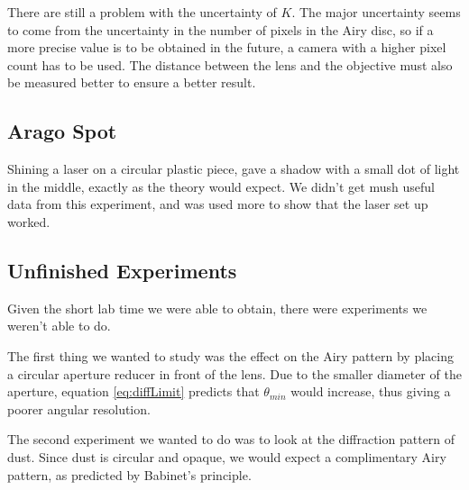 \documentclass{emulateapj}
\begin{document}
There are still a problem with the uncertainty of $K$. The major uncertainty seems to come from the uncertainty in the number of pixels in the Airy disc, so if a more precise value is to be obtained in the future, a camera with a higher pixel count has to be used. The distance between the lens and the objective must also be measured better to ensure a better result.


\subsection{Arago Spot}
Shining a laser on a circular plastic piece, gave a shadow with a small dot of light in the middle, exactly as the theory would expect. We didn't get mush useful data from this experiment, and was used more to show that the laser set up worked.

\subsection{Unfinished Experiments}
Given the short lab time we were able to obtain, there were experiments we weren't able to do.

The first thing we wanted to study was the effect on the Airy pattern by placing a circular aperture reducer in front of the lens. Due to the smaller diameter of the aperture, equation \eqref{eq:diffLimit} predicts that $\theta_{min}$ would increase, thus giving a poorer angular resolution.

The second experiment we wanted to do was to look at the diffraction pattern of dust. Since dust is circular and opaque, we would expect a complimentary Airy pattern, as predicted by Babinet's principle.

\begin{thebibliography}{}
%
%
\end{thebibliography}
\end{document}
